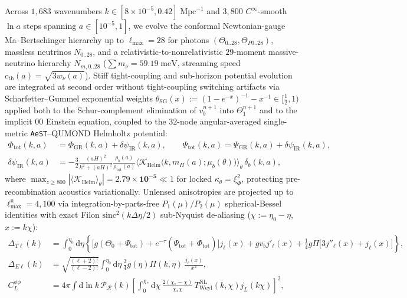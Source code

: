 \documentclass[11pt,a4paper]{article}
\begin{document}
Across $1{,}683$ wavenumbers $k \in [8\times 10^{-5}, 0.42]\;\mathrm{Mpc}^{-1}$ and $3{,}800$ $C^\infty$-smooth $\ln a$ steps spanning $a \in [10^{-5}, 1]$, we evolve the conformal Newtonian-gauge Ma--Bertschinger hierarchy \cite{MaBertschinger1995} up to $\ell_{\max} = 28$ for photons $(\Theta_{0..28}, \Theta_{P0..28})$, massless neutrinos $N_{0..28}$, and a relativistic-to-nonrelativistic $29$-moment massive-neutrino hierarchy $N_{m,0..28}$ ($\sum m_\nu = 59.19\;\mathrm{meV}$, streaming speed $c_{\mathrm{th}}(a) = \sqrt{3 w_\nu(a)}$). Stiff tight-coupling and sub-horizon potential evolution are integrated at second order without tight-coupling switching artifacts via Scharfetter--Gummel exponential weights $\theta_{\mathrm{SG}}(x) := (1 - e^{-x})^{-1} - x^{-1} \in [\frac{1}{2}, 1)$ applied both to the Schur-complement elimination of $v_b^{n+1}$ into $\Theta_1^{n+1}$ and to the implicit $00$ Einstein equation, coupled to the $32$-node angular-averaged single-metric \texttt{AeST}--QUMOND Helmholtz potential:
\begin{equation}
\begin{aligned}
  \Phi_{\mathrm{tot}}(k,a) &= \Phi_{\mathrm{GR}}(k,a) + \delta\psi_{\mathrm{IR}}(k,a), \qquad \Psi_{\mathrm{tot}}(k,a) = \Psi_{\mathrm{GR}}(k,a) + \delta\psi_{\mathrm{IR}}(k,a), \\
  \delta\psi_{\mathrm{IR}}(k,a) &= -\frac{3}{2}\frac{(aH)^2}{k^2 + (aH)^2}\frac{\rho_b(a)}{\rho_{\mathrm{tot}}(a)}\bigl\langle\mathcal{K}_{\mathrm{Helm}}\bigl(k, m_H(a); \mu_b(\theta)\bigr)\bigr\rangle_\theta\,\delta_b(k,a),
\end{aligned}
\label{eq:boltzmann-hierarchy}
\end{equation}
where $\max_{z \ge 800}|\langle\mathcal{K}_{\mathrm{Helm}}\rangle_\theta| = \mathbf{2.79\times 10^{-5}} \ll 1$ for locked $\kappa_\theta = \xi_\Phi^2$, protecting pre-recombination acoustics variationally. Unlensed anisotropies are projected up to $\ell_{\max}^{\mathrm{u}} = 4{,}100$ via integration-by-parts-free $P_1(\mu)/P_2(\mu)$ spherical-Bessel identities \cite{SeljakZaldarriaga1996} with exact Filon $\mathrm{sinc}^2(k\Delta\eta/2)$ sub-Nyquist de-aliasing ($\chi := \eta_0 - \eta$, $x := k\chi$):
\begin{equation}
\begin{aligned}
  \Delta_{T\ell}(k) &= \int_0^{\eta_0}\!\mathrm{d}\eta\left\{\bigl[g(\Theta_0 + \Psi_{\mathrm{tot}}) + e^{-\tau}(\dot{\Psi}_{\mathrm{tot}} + \dot{\Phi}_{\mathrm{tot}})\bigr]j_\ell(x) + g v_b j'_\ell(x) + \frac{1}{4}g\Pi\bigl[3j''_\ell(x) + j_\ell(x)\bigr]\right\}, \\
  \Delta_{E\ell}(k) &= \sqrt{\frac{(\ell+2)!}{(\ell-2)!}}\int_0^{\eta_0}\!\mathrm{d}\eta\,\frac{3}{4}g(\eta)\Pi(k,\eta)\,\frac{j_\ell(x)}{x^2}, \\
  C_L^{\phi\phi} &= 4\pi\int\mathrm{d}\ln k\,\mathcal{P}_{\mathcal{R}}(k)\left[\int_0^{\chi_*}\!\mathrm{d}\chi\,\frac{2(\chi_* - \chi)}{\chi_*\chi}\,T_{\mathrm{Weyl}}^{\mathrm{NL}}(k,\chi)j_L(k\chi)\right]^{\!2},
\end{aligned}
\label{eq:los-ee}
\end{equation}
\end{document}
